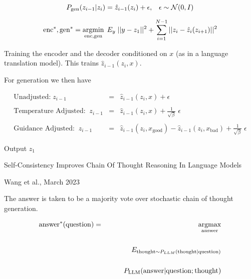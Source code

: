 {$$P_{\mathrm{gen}}(z_{i-1}|z_i) = \hat{z}_{i-1}(z_i) + \epsilon,\;\;\;\epsilon\sim {\cal N}(0,I)$$

$$\mathrm{enc}^*,\mathrm{gen}^* = \operatorname*{argmin}_{\mathrm{enc},\mathrm{gen}} \;E_y\;||y - z_1||^2 + \sum_{i=1}^{N-1} ||z_i - \hat{z}_i(z_{i+1})||^2$$


Training the encoder and the decoder conditioned on $x$ (as in a language translation model).
This trains $\hat{z}_{i-1}(z_i,x)$.

\vfill
For generation we then have

{\huge
\begin{eqnarray*}
\mbox{Unadjusted:} \;z_{i-1} & = & \hat{z}_{i-1}(z_i,x) + \epsilon \\
\\
\mbox{Temperature Adjusted:}\;\;z_{i-1} & = & \hat{z}_{i-1}(z_i,x) + \frac{1}{\sqrt{\beta}}\;\epsilon \\
\\
\mbox{Guidance Adjusted:} \;\;z_{i-1} & = & \hat{z}_{i-1}(z_i,x_\mathrm{good}) - \hat{z}_{i-1}(z_i,x_\mathrm{bad}) + \frac{1}{\sqrt{\beta}}\;\epsilon
\end{eqnarray*}
}

\vfill
Output $z_1$

\newcommand{\answer}{\mathrm{answer}}
\newcommand{\thought}{\mathrm{thought}}
\newcommand{\question}{\mathrm{question}}
\newcommand{\LLM}{\mathrm{LLM}}

{\huge
\centerline{Self-Consistency Improves Chain Of Thought Reasoning In Language Models}
\centerline{Wang et al., March 2023}
}
\vfill
The answer is taken to be a majority vote over stochastic chain of thought generation.

\begin{eqnarray*}
\answer^*(\question) 
& = & \argmax_{\answer}\\
\\
& & \;\;\;\;E_{\thought \sim P_{LLM}({\thought|\question})} \\
\\
& & \;\;\;\;\;\;\;\;P_\LLM(\answer|\question;\thought)
\end{eqnarray*}


}



